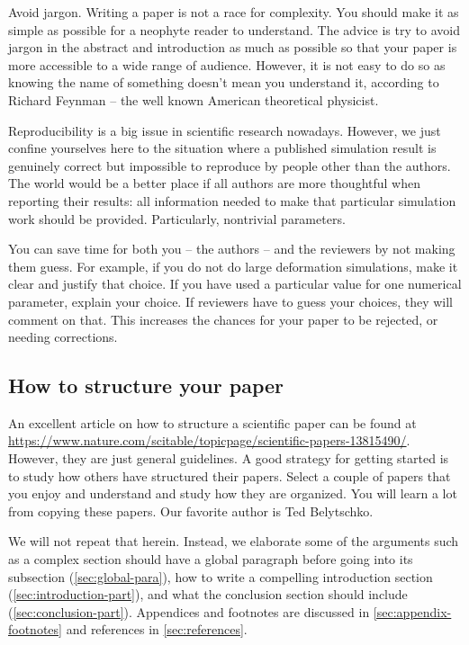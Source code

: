 \documentclass[authoryear,3p,times,preprint,review,fleqn]{elsarticle}
\numberwithin{equation}{section}
\theoremstyle{remark}
\begin{document}
Avoid jargon.  Writing a paper is not a race for complexity. You should make it as simple as possible for a neophyte reader to understand.
The advice is try to avoid jargon in the abstract and introduction as much as possible so that your paper is more accessible to a wide range of audience. However, it is not easy to do so as knowing the name of something doesn’t mean you understand it, according to Richard Feynman -- the well known American theoretical physicist.

Reproducibility is a big issue in scientific research nowadays. However, we just confine yourselves here to the situation where a published simulation result is genuinely correct but impossible to reproduce by people other than the authors. The world would be a better place if all authors are more thoughtful when reporting their results: all information needed to make that particular simulation work should be provided. Particularly, nontrivial parameters.

You can save time for both you -- the authors -- and the reviewers by not making them guess. For example, if you do not do large deformation simulations, make it clear and justify that choice. If you have used a particular value for one numerical parameter, explain your choice. If reviewers have to guess your choices, they will comment on that. This increases the chances for your paper to be rejected, or needing corrections.




\subsection{How to structure your paper}\label{structure}


An excellent article on how to structure a scientific paper can be found at \url{https://www.nature.com/scitable/topicpage/scientific-papers-13815490/}. However, they are just general guidelines. A good strategy for getting started is to study how others have structured their papers. Select a couple of papers that you enjoy and understand and study how they are organized. You will learn a lot from copying these papers. Our favorite author is Ted Belytschko.

 We will not repeat that herein. Instead, we elaborate some of the arguments such as a complex section should have a global paragraph before going into its subsection (\cref{sec:global-para}), how to write a compelling introduction section (\cref{sec:introduction-part}), and 
what the conclusion section  should include (\cref{sec:conclusion-part}).  Appendices and footnotes are discussed in \cref{sec:appendix-footnotes} and references in \cref{sec:references}.
\end{document}
